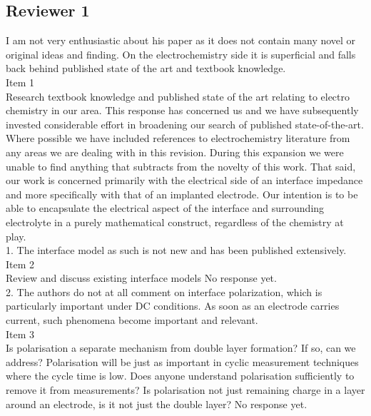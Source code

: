 \documentclass[journal, a4paper]{IEEEtran}
\begin{document}
{\subsection*{Reviewer 1}

{\color{blue}
I am not very enthusiastic about his paper as it does not contain many novel or original ideas and finding. On the electrochemistry side it is superficial and falls back behind published state of the art and textbook knowledge.\\
{\color{OliveGreen}
    Item 1\\
    {\color{Red} Research textbook knowledge and published state of the art relating to electro chemistry in our area.}
    This response has concerned us and we have subsequently invested considerable effort in broadening our search of published state-of-the-art. Where possible we have included references to electrochemistry literature from any areas we are dealing with in this revision. During this expansion we were unable to find anything that subtracts from the novelty of this work. That said, our work is concerned primarily with the electrical side of an interface impedance and more specifically with that of an implanted electrode. Our intention is to be able to encapsulate the electrical aspect of the interface and surrounding electrolyte in a purely mathematical construct, regardless of the chemistry at play.
}\\

1. The interface model as such is not new and has been published extensively.\\
{\color{OliveGreen}
    Item 2\\
    {\color{Red} Review and discuss existing interface models}
    No response yet.
}\\

2. The authors do not at all comment on interface polarization, which is particularly important under DC conditions. As soon as an electrode carries current, such phenomena become important and relevant.\\
{\color{OliveGreen}
    Item 3\\
    {\color{Red} Is polarisation a separate mechanism from double layer formation? If so, can we address? Polarisation will be just as important in cyclic measurement techniques where the cycle time is low. Does anyone understand polarisation sufficiently to remove it from measurements? Is polarisation not just remaining charge in a layer around an electrode, is it not just the double layer?}
    No response yet.
}\\

}}
\end{document}
